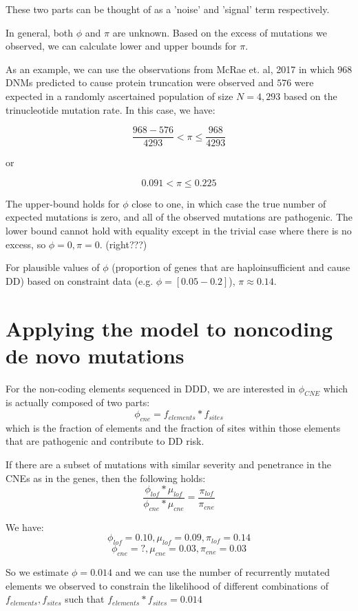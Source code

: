\documentclass[twoside]{article}
\begin{document}
\normalsize
These two parts can be thought of as a 'noise' and 'signal' term respectively.

In general, both $\phi$ and $\pi$ are unknown. Based on the excess of mutations we observed, we can calculate lower and upper bounds for $\pi$.

As an example, we can use the observations from McRae et. al, 2017 in which $968$ DNMs predicted to cause protein truncation were observed and $576$ were expected in a randomly ascertained population of size $N=4,293$ based on the trinucleotide mutation rate. In this case, we have:

$$ \frac{968-576}{4293} < \pi \leq \frac{968}{4293} $$

or

$$ 0.091 < \pi \leq  0.225 $$

The upper-bound holds for $\phi$ close to one, in which case the true number of expected mutations is zero, and all of the observed mutations are pathogenic. The lower bound cannot hold with equality except in the trivial case where there is no excess, so $\phi = 0, \pi = 0$. (right???)

For plausible values of $\phi$ (proportion of genes that are haploinsufficient and cause DD) based on constraint data (e.g. $\phi = [0.05 - 0.2]$),  $\pi \approx 0.14$.

\section{Applying the model to noncoding de novo mutations}

For the non-coding elements sequenced in DDD, we are interested in $\phi_{CNE}$ which is actually composed of two parts: $$\phi_{cne} = f_{elements} * f_{sites}$$ which is the fraction of elements and the fraction of sites within those elements that are pathogenic and contribute to DD risk.

If there are a subset of mutations with similar severity and penetrance in the CNEs as in the genes, then the following holds:
\[
\frac{\phi_{lof} * \mu_{lof}}{\phi_{cne} * \mu_{cne}} = \frac{\pi_{lof}}{\pi_{cne}} 
\]

We have:
$$\phi_{lof} = 0.10, \mu_{lof} = 0.09, \pi_{lof} = 0.14$$
$$\phi_{cne} = ?, \mu_{cne} = 0.03, \pi_{cne} = 0.03$$

So we estimate $\phi = 0.014$ and we can use the number of recurrently mutated elements we observed to constrain the likelihood of different combinations of $f_{elements}, f_{sites}$ such that $f_{elements} * f_{sites} = 0.014$
\end{document}
